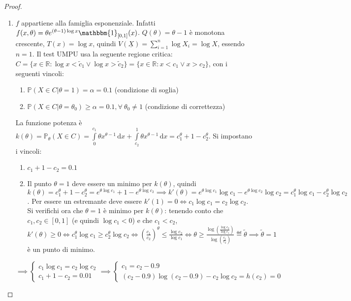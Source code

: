\documentclass[hidelinks, 10pt]{report}
\begin{document}
\begin{proof}
\noindent
\begin{enumerate}
\item $ f $ appartiene alla famiglia esponenziale. Infatti $ f (x, \theta) = \theta e^{(\theta - 1) \log x} \mathbbm{1}_{[0,1]} (x) $. $ Q(\theta) = \theta - 1 $ \`e monotona crescente, $ T(x) = \log x $, quindi $ V(\underline{X}) = \sum\limits_{i = 1}^{n} \log X_{i} = \log X $, essendo $ n = 1 $. Il test UMPU usa la seguente regione critica: $ C = \{ x \in \mathbb{R} : \log x < \tilde{c}_{1} \lor \log x > \tilde{c}_{2} \} = \{ x \in \mathbb{R} : x < c_{1} \lor x > c_{2} \} $, con i seguenti vincoli:
\begin{enumerate}
\item $ \mathbb{P} (X \in C \vert \theta  = 1) = \alpha = 0.1 $ (condizione di soglia)
\item $ \mathbb{P} (X \in C \vert \theta  = \theta_{0}) \ge \alpha = 0.1, \forall\ \theta_{0} \ne 1 $ (condizione di correttezza)
\end{enumerate}

La funzione potenza \`e $ k(\theta) = \mathbb{P}_{\theta} (X \in C) = \int\limits_{0}^{c_{1}} \theta x^{\theta - 1} \, \mathrm{d}x + \int\limits_{c_{2}}^{1} \theta x^{\theta - 1} \, \mathrm{d}x = c_{1}^{\theta} + 1 - c_{2}^{\theta} $. Si impostano i vincoli:
\begin{enumerate}
\item $ c_{1}  + 1 - c_{2} = 0.1 $
\item Il punto $ \theta  = 1 $ deve essere un minimo per $ k(\theta) $, quindi $ k(\theta) = c_{1}^{\theta} + 1 - c_{2}^{\theta} = e^{\theta \log c_{1}} + 1 - e^{\theta \log c_{2}} \implies k'(\theta) = e^{\theta \log c_{1}} \log c_{1} - e^{\theta \log c_{2}} \log c_{2} = c_{1}^{\theta} \log c_{1} - c_{2}^{\theta} \log c_{2} $. Per essere un estremante deve essere $ k'(1) = 0 \iff c_{1} \log c_{1} = c_{2} \log c_{2} $. Si verifichi ora che $ \theta = 1 $ \`e minimo per $ k(\theta) $: tenendo conto che $ c_{1}, c_{2} \in [0,1] $ (e quindi $ \log c_{1} < 0 $) e che $ c_{1} < c_{2} $, $ k'(\theta) \ge 0 \iff c_{1}^{\theta} \log c_{1} \ge c_{2}^{\theta} \log c_{2} \iff \left( \frac{c_{1}}{c_{2}} \right)^{\theta} \le \frac{\log c_{2}}{\log c_{1}} \iff \theta \ge \frac{\log \left( \frac{\log c_{2}}{\log c_{1}} \right)}{\log \left( \frac{c_{1}}{c_{2}} \right)} \eqdef \tilde{\theta} \implies \tilde{\theta} = 1 $ \`e un punto di minimo.
\end{enumerate}

$ \implies \begin{cases}
c_{1} \log c_{1} = c_{2} \log c_{2} \\
c_{1} + 1 - c_{2} = 0.01
\end{cases} \implies \begin{cases}
c_{1} = c_{2} - 0.9 \\
(c_{2} - 0.9) \log (c_{2} - 0.9) - c_{2} \log c_{2} = h(c_{2}) = 0
\end{cases} $


\end{enumerate}
\end{proof}
\end{document}
